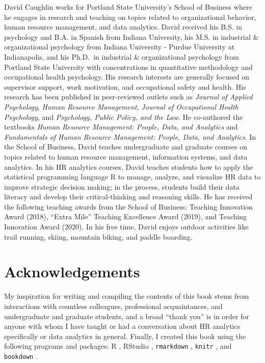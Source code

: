 \documentclass[]{book}
\begin{document}
David Caughlin works for Portland State University's School of Business
where he engages in research and teaching on topics related to
organizational behavior, human resource management, and data analytics.
David received his B.S. in psychology and B.A. in Spanish from Indiana
University, his M.S. in industrial \& organizational psychology from
Indiana University - Purdue University at Indianapolis, and his Ph.D.~in
industrial \& organizational psychology from Portland State University
with concentrations in quantitative methodology and occupational health
psychology. His research interests are generally focused on supervisor
support, work motivation, and occupational safety and health. His
research has been published in peer-reviewed outlets such as
\emph{Journal of Applied Psychology}, \emph{Human Resource Management},
\emph{Journal of Occupational Health Psychology}, and \emph{Psychology,
Public Policy, and the Law}. He co-authored the textbooks \emph{Human
Resource Management: People, Data, and Analytics} and \emph{Fundamentals
of Human Resource Management: People, Data, and Analytics}. In the
School of Business, David teaches undergraduate and graduate courses on
topics related to human resource management, information systems, and
data analytics. In his HR analytics courses, David teaches students how
to apply the statistical programming language R to manage, analyze, and
visualize HR data to improve strategic decision making; in the process,
students build their data literacy and develop their critical-thinking
and reasoning skills. He has received the following teaching awards from
the School of Business: Teaching Innovation Award (2018), ``Extra Mile''
Teaching Excellence Award (2019), and Teaching Innovation Award (2020).
In his free time, David enjoys outdoor activities like trail running,
skiing, mountain biking, and paddle boarding.

\section{Acknowledgements}\label{acknowpref}

My inspiration for writing and compiling the contents of this book stems
from interactions with countless colleagues, professional acquaintances,
and undergraduate and graduate students, and a broad ``thank you'' is in
order for anyone with whom I have taught or had a conversation about HR
analytics specifically or data analytics in general. Finally, I created
this book using the following programs and packages: R \citep{R-base},
RStudio \citep{rstudio2020}, \texttt{rmarkdown}
\citep{rmarkdown2018, R-rmarkdown}, \texttt{knitr}
\citep{knitr2015, knitr2014, R-knitr}, and \texttt{bookdown}
\citep{bookdown2016, R-bookdown}.
\end{document}
